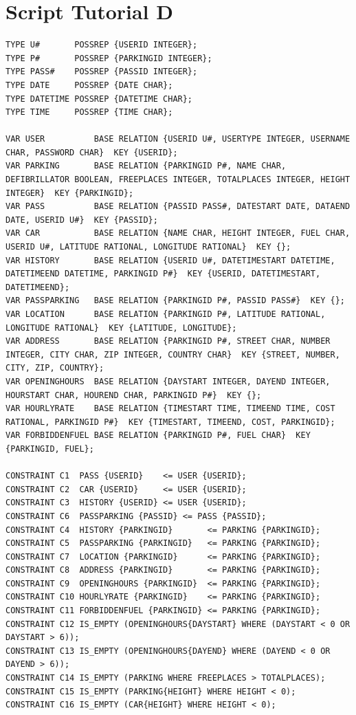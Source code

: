 \documentclass[a4paper,11pt]{article}
\begin{document}
\section{Script Tutorial D}\label{tutoriald}
\begin{lstlisting}
TYPE U#       POSSREP {USERID INTEGER};
TYPE P#       POSSREP {PARKINGID INTEGER};
TYPE PASS#    POSSREP {PASSID INTEGER};
TYPE DATE     POSSREP {DATE CHAR};
TYPE DATETIME POSSREP {DATETIME CHAR};
TYPE TIME     POSSREP {TIME CHAR};

VAR USER          BASE RELATION {USERID U#, USERTYPE INTEGER, USERNAME CHAR, PASSWORD CHAR}  KEY {USERID};
VAR PARKING       BASE RELATION {PARKINGID P#, NAME CHAR, DEFIBRILLATOR BOOLEAN, FREEPLACES INTEGER, TOTALPLACES INTEGER, HEIGHT INTEGER}  KEY {PARKINGID};
VAR PASS          BASE RELATION {PASSID PASS#, DATESTART DATE, DATAEND DATE, USERID U#}  KEY {PASSID};
VAR CAR           BASE RELATION {NAME CHAR, HEIGHT INTEGER, FUEL CHAR, USERID U#, LATITUDE RATIONAL, LONGITUDE RATIONAL}  KEY {};
VAR HISTORY       BASE RELATION {USERID U#, DATETIMESTART DATETIME, DATETIMEEND DATETIME, PARKINGID P#}  KEY {USERID, DATETIMESTART, DATETIMEEND};
VAR PASSPARKING   BASE RELATION {PARKINGID P#, PASSID PASS#}  KEY {};
VAR LOCATION      BASE RELATION {PARKINGID P#, LATITUDE RATIONAL, LONGITUDE RATIONAL}  KEY {LATITUDE, LONGITUDE};
VAR ADDRESS       BASE RELATION {PARKINGID P#, STREET CHAR, NUMBER INTEGER, CITY CHAR, ZIP INTEGER, COUNTRY CHAR}  KEY {STREET, NUMBER, CITY, ZIP, COUNTRY};
VAR OPENINGHOURS  BASE RELATION {DAYSTART INTEGER, DAYEND INTEGER, HOURSTART CHAR, HOUREND CHAR, PARKINGID P#}  KEY {};
VAR HOURLYRATE    BASE RELATION {TIMESTART TIME, TIMEEND TIME, COST RATIONAL, PARKINGID P#}  KEY {TIMESTART, TIMEEND, COST, PARKINGID};
VAR FORBIDDENFUEL BASE RELATION {PARKINGID P#, FUEL CHAR}  KEY {PARKINGID, FUEL};

CONSTRAINT C1  PASS {USERID}    <= USER {USERID};
CONSTRAINT C2  CAR {USERID}     <= USER {USERID};
CONSTRAINT C3  HISTORY {USERID} <= USER {USERID};
CONSTRAINT C6  PASSPARKING {PASSID} <= PASS {PASSID};
CONSTRAINT C4  HISTORY {PARKINGID}       <= PARKING {PARKINGID};
CONSTRAINT C5  PASSPARKING {PARKINGID}   <= PARKING {PARKINGID};
CONSTRAINT C7  LOCATION {PARKINGID}      <= PARKING {PARKINGID};
CONSTRAINT C8  ADDRESS {PARKINGID}       <= PARKING {PARKINGID};
CONSTRAINT C9  OPENINGHOURS {PARKINGID}  <= PARKING {PARKINGID};
CONSTRAINT C10 HOURLYRATE {PARKINGID}    <= PARKING {PARKINGID};
CONSTRAINT C11 FORBIDDENFUEL {PARKINGID} <= PARKING {PARKINGID};
CONSTRAINT C12 IS_EMPTY (OPENINGHOURS{DAYSTART} WHERE (DAYSTART < 0 OR DAYSTART > 6));
CONSTRAINT C13 IS_EMPTY (OPENINGHOURS{DAYEND} WHERE (DAYEND < 0 OR DAYEND > 6));
CONSTRAINT C14 IS_EMPTY (PARKING WHERE FREEPLACES > TOTALPLACES);
CONSTRAINT C15 IS_EMPTY (PARKING{HEIGHT} WHERE HEIGHT < 0);
CONSTRAINT C16 IS_EMPTY (CAR{HEIGHT} WHERE HEIGHT < 0);


\end{lstlisting}
\end{document}
